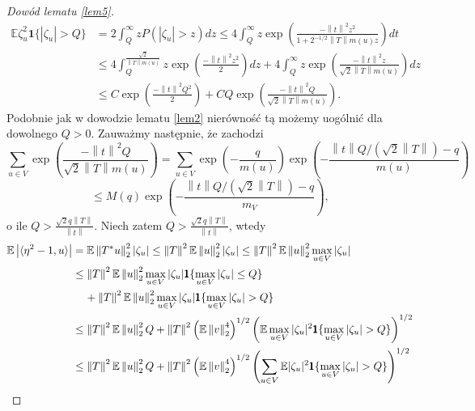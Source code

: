 \documentclass[man,mfiu]{mgrwms}
\newcommand{\norm}[1]{\left\lVert#1\right\rVert}
\begin{document}
\begin{proof}[Dowód lematu \ref{lem5}]
\begin{displaymath}
\begin{split}
\mathbb{E}\zeta_u^2\pmb{1}\{|\zeta_u|>Q\}&=2\int_Q^{\infty}zP\left(|\zeta_u|>z\right)dz\leq 4\int_Q^{\infty}z\exp\left(\frac{-\norm{t}^2z^2}{1+2^{-1/2}\norm{T}m(u)z}\right)dt\\ 
&\leq 4\int_Q^{\frac{\sqrt{2}}{\norm{T}m(u)}}z\exp \left(\frac{-\norm{t}^2z^2}{2}\right)dz+4\int_Q^{\infty}z\exp\left(\frac{-\norm{t}^2z}{\sqrt{2}\norm{T}m(u)}\right)dz\\\
&\leq C \exp \left(\frac{-\norm{t}^2Q^2}{2}\right)+CQ\exp\left(\frac{-\norm{t}^2Q}{\sqrt{2}\norm{T}m(u)}\right).
\end{split}
\end{displaymath}
Podobnie jak w dowodzie lematu \ref{lem2} nierówność tą możemy uogólnić dla dowolnego $Q>0$.
Zauważmy następnie, że zachodzi
\begin{displaymath}
\sum_{u\in V}\exp\left(\frac{-\norm{t}^2Q}{\sqrt{2}\norm{T}m(u)}\right)=\sum_{u\in V}\exp\left(-\frac{q}{m(u)}\right)\exp\left(-\frac{\norm{t}Q/(\sqrt{2}\norm{T})-q}{m(u)}\right)
\end{displaymath}
\begin{displaymath}
\leq M(q)\exp\left(-\frac{\norm{t}Q/(\sqrt{2}\norm{T})-q}{m_V}\right),
\end{displaymath}
o ile $Q>\frac{\sqrt{2}q\norm{T}}{\norm{t}}$. Niech zatem $Q>\frac{\sqrt{2}q\norm{T}}{\norm{t}}$, wtedy 
\begin{displaymath}
\begin{split}
\mathbb{E}\left| \langle \eta^2-1, u\rangle\right|&=\mathbb{E}\norm{T^*u}^2_2|\zeta_u|\leq \norm{T}^2\mathbb{E}\norm{u}^2_2|\zeta_u| \leq \norm{T}^2\mathbb{E}\norm{u}^2_2\max_{u\in V}|\zeta_u|\\
&\leq \norm{T}^2\mathbb{E}\norm{u}^2_2\max_{u\in V}|\zeta_u|\pmb{1}\{\max_{u\in V}|\zeta_u|\leq Q\}\\&\hspace{4mm}+\norm{T}^2\mathbb{E}\norm{u}^2_2\max_{u\in V}|\zeta_u|\pmb{1}\{\max_{u\in V}|\zeta_u|> Q\}\\
&\leq \norm{T}^2\mathbb{E}\norm{u}^2_2Q+\norm{T}^2\left(\mathbb{E}\norm{v}^4_2\right)^{1/2}\left(\mathbb{E}\max_{u\in V}|\zeta_u|^2\pmb{1}\{\max_{u\in V}|\zeta_u|> Q\}\right)^{1/2}\\
&\leq  \norm{T}^2\mathbb{E}\norm{u}^2_2Q+\norm{T}^2\left(\mathbb{E}\norm{v}^4_2\right)^{1/2}\left(\sum_{u\in V}\mathbb{E}|\zeta_u|^2\pmb{1}\{\max_{u\in V}|\zeta_u|> Q\}\right)^{1/2}\\

\end{split}
\end{displaymath}
\end{proof}
\end{document}
